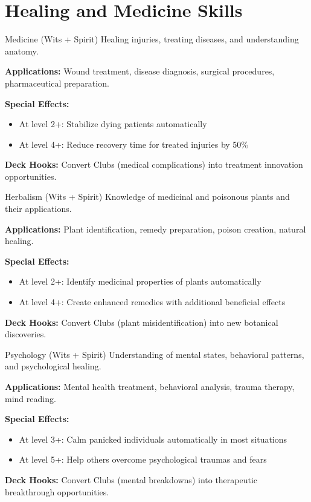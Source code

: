 \section{Healing and Medicine Skills}

\begin{skillbox}{Medicine (Wits + Spirit)}
Healing injuries, treating diseases, and understanding anatomy.

\textbf{Applications:} Wound treatment, disease diagnosis, surgical procedures, pharmaceutical preparation.

\textbf{Special Effects:}
\begin{itemize}
    \item At level 2+: Stabilize dying patients automatically
    \item At level 4+: Reduce recovery time for treated injuries by 50\%
\end{itemize}

\textbf{Deck Hooks:} Convert Clubs (medical complications) into treatment innovation opportunities.
\end{skillbox}

\begin{skillbox}{Herbalism (Wits + Spirit)}
Knowledge of medicinal and poisonous plants and their applications.

\textbf{Applications:} Plant identification, remedy preparation, poison creation, natural healing.

\textbf{Special Effects:}
\begin{itemize}
    \item At level 2+: Identify medicinal properties of plants automatically
    \item At level 4+: Create enhanced remedies with additional beneficial effects
\end{itemize}

\textbf{Deck Hooks:} Convert Clubs (plant misidentification) into new botanical discoveries.
\end{skillbox}

\begin{skillbox}{Psychology (Wits + Spirit)}
Understanding of mental states, behavioral patterns, and psychological healing.

\textbf{Applications:} Mental health treatment, behavioral analysis, trauma therapy, mind reading.

\textbf{Special Effects:}
\begin{itemize}
    \item At level 3+: Calm panicked individuals automatically in most situations
    \item At level 5+: Help others overcome psychological traumas and fears
\end{itemize}

\textbf{Deck Hooks:} Convert Clubs (mental breakdowns) into therapeutic breakthrough opportunities.
\end{skillbox}

